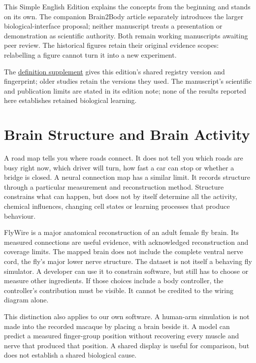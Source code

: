 This Simple English Edition explains the concepts from the beginning and
stands on its own. The companion Brain2Body article separately introduces the
larger biological-interface proposal; neither manuscript treats a presentation
or demonstration as scientific authority.\cite{brain2bodyworking} Both remain
working manuscripts awaiting peer review. The historical figures retain their original
evidence scopes: relabelling a figure cannot turn it into a new experiment.

The \hyperref[programme-definitions]{definition supplement} gives this edition's
shared registry version and fingerprint; older studies retain the versions they
used. The manuscript's scientific and publication limits are stated in its edition note;
none of the results reported here establishes retained biological learning.

\section{Brain Structure and Brain Activity}

A road map tells you where roads connect. It does not tell you which roads are
busy right now, which driver will turn, how fast a car can stop or whether a
bridge is closed. A neural connection map has a similar limit. It records
structure through a particular measurement and reconstruction method. Structure
constrains what can happen, but does not by itself determine all the activity,
chemical influences, changing cell states or learning processes that produce
behaviour.

FlyWire is a major anatomical reconstruction of an adult female fly brain.
Its measured connections are useful evidence, with acknowledged reconstruction
and coverage limits. The mapped brain does not include the complete ventral
nerve cord, the fly's major lower nerve structure. The dataset is not itself a
behaving fly simulator.\cite{flywire2024} A developer can use it to constrain
software, but still has to choose or measure other ingredients. If those
choices include a body controller, the controller's contribution must be
visible. It cannot be credited to the wiring diagram alone.

This distinction also applies to our own software. A human-arm simulation is
not made into the recorded macaque by placing a brain beside it. A model can
predict a measured finger-group position without recovering every muscle and
nerve that produced that position. A shared display is useful for comparison,
but does not establish a shared biological cause.

